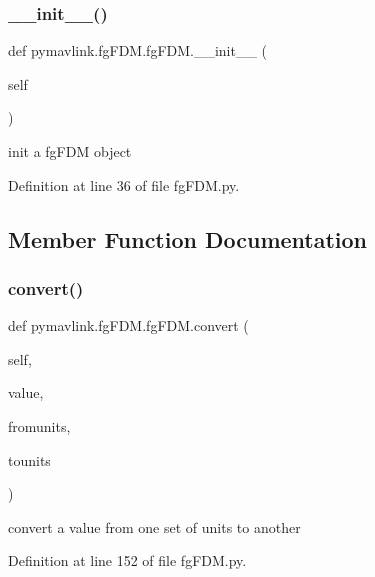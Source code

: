 \subsubsection{\texorpdfstring{\_\_init\_\_()}{\_\_init\_\_()}}
{\footnotesize\ttfamily def pymavlink.\+fg\+F\+D\+M.\+fg\+F\+D\+M.\+\_\+\+\_\+init\+\_\+\+\_\+ (\begin{DoxyParamCaption}\item[{}]{self }\end{DoxyParamCaption})}

\begin{DoxyVerb}init a fgFDM object\end{DoxyVerb}
 

Definition at line 36 of file fg\+F\+D\+M.\+py.



\subsection{Member Function Documentation}
\mbox{\label{classpymavlink_1_1fgFDM_1_1fgFDM_a3b8200822cb649c87cda6d625a168871}} 
\subsubsection{\texorpdfstring{convert()}{convert()}}
{\footnotesize\ttfamily def pymavlink.\+fg\+F\+D\+M.\+fg\+F\+D\+M.\+convert (\begin{DoxyParamCaption}\item[{}]{self,  }\item[{}]{value,  }\item[{}]{fromunits,  }\item[{}]{tounits }\end{DoxyParamCaption})}

\begin{DoxyVerb}convert a value from one set of units to another\end{DoxyVerb}
 

Definition at line 152 of file fg\+F\+D\+M.\+py.

\mbox{\label{classpymavlink_1_1fgFDM_1_1fgFDM_a0d1625275f9a8c52f3b11bd403b29c4a}} 
